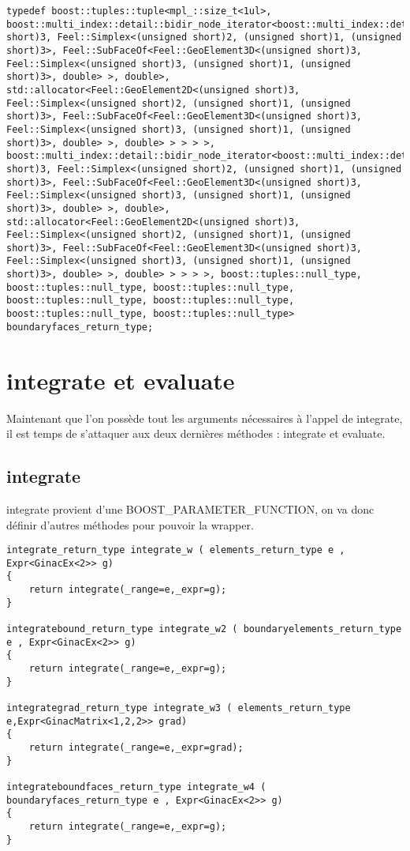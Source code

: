 \documentclass[12pt]{article}
\begin{document}
\begin{lstlisting}
typedef boost::tuples::tuple<mpl_::size_t<1ul>, boost::multi_index::detail::bidir_node_iterator<boost::multi_index::detail::ordered_index_node<boost::multi_index::detail::index_node_base<Feel::GeoElement2D<(unsigned short)3, Feel::Simplex<(unsigned short)2, (unsigned short)1, (unsigned short)3>, Feel::SubFaceOf<Feel::GeoElement3D<(unsigned short)3, Feel::Simplex<(unsigned short)3, (unsigned short)1, (unsigned short)3>, double> >, double>, std::allocator<Feel::GeoElement2D<(unsigned short)3, Feel::Simplex<(unsigned short)2, (unsigned short)1, (unsigned short)3>, Feel::SubFaceOf<Feel::GeoElement3D<(unsigned short)3, Feel::Simplex<(unsigned short)3, (unsigned short)1, (unsigned short)3>, double> >, double> > > > >, boost::multi_index::detail::bidir_node_iterator<boost::multi_index::detail::ordered_index_node<boost::multi_index::detail::index_node_base<Feel::GeoElement2D<(unsigned short)3, Feel::Simplex<(unsigned short)2, (unsigned short)1, (unsigned short)3>, Feel::SubFaceOf<Feel::GeoElement3D<(unsigned short)3, Feel::Simplex<(unsigned short)3, (unsigned short)1, (unsigned short)3>, double> >, double>, std::allocator<Feel::GeoElement2D<(unsigned short)3, Feel::Simplex<(unsigned short)2, (unsigned short)1, (unsigned short)3>, Feel::SubFaceOf<Feel::GeoElement3D<(unsigned short)3, Feel::Simplex<(unsigned short)3, (unsigned short)1, (unsigned short)3>, double> >, double> > > > >, boost::tuples::null_type, boost::tuples::null_type, boost::tuples::null_type, boost::tuples::null_type, boost::tuples::null_type, boost::tuples::null_type, boost::tuples::null_type> boundaryfaces_return_type;

\end{lstlisting}


\section{integrate et evaluate}

Maintenant que l'on possède tout les arguments nécessaires à l'appel de integrate, il est temps de s'attaquer aux deux dernières méthodes : integrate et evaluate.

\subsection{integrate}

integrate provient d'une BOOST\_PARAMETER\_FUNCTION, on va donc définir d'autres méthodes pour pouvoir la wrapper.
\begin{lstlisting}
integrate_return_type integrate_w ( elements_return_type e , Expr<GinacEx<2>> g)
{
    return integrate(_range=e,_expr=g);
}

integratebound_return_type integrate_w2 ( boundaryelements_return_type e , Expr<GinacEx<2>> g)
{
    return integrate(_range=e,_expr=g);
}

integrategrad_return_type integrate_w3 ( elements_return_type e,Expr<GinacMatrix<1,2,2>> grad)
{
    return integrate(_range=e,_expr=grad);
}

integrateboundfaces_return_type integrate_w4 ( boundaryfaces_return_type e , Expr<GinacEx<2>> g)
{
    return integrate(_range=e,_expr=g);
}
\end{lstlisting}
\end{document}
